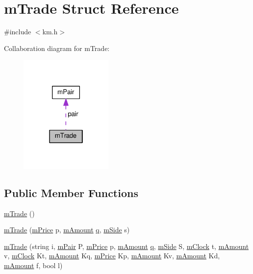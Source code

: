 \hypertarget{struct_k_1_1m_trade}{}\section{m\+Trade Struct Reference}
\label{struct_k_1_1m_trade}


{\ttfamily \#include $<$km.\+h$>$}



Collaboration diagram for m\+Trade\+:
\nopagebreak
\begin{figure}[H]
\begin{center}
\leavevmode
\includegraphics[width=130pt]{struct_k_1_1m_trade__coll__graph}
\end{center}
\end{figure}
\subsection*{Public Member Functions}
\begin{DoxyCompactItemize}
\item 
\hyperlink{struct_k_1_1m_trade_a645b1cd153838348bc43a21a1d5f70a4}{m\+Trade} ()
\item 
\hyperlink{struct_k_1_1m_trade_a34abd866cec68d1c3cc750375ecfd16a}{m\+Trade} (\hyperlink{km_8h_a392f9b7f384aa3539bbb890b059f5b8c}{m\+Price} p, \hyperlink{km_8h_ad4d00888c55a47a8a40ed8020d176086}{m\+Amount} \hyperlink{namespace_k_a211862d8b09ec46a051464b6859c1306a7694f4a66316e53c8cdd9d9954bd611d}{q}, \hyperlink{namespace_k_a0b7d0fa0ffc9f87da1d6499cbcee7e94}{m\+Side} s)
\item 
\hyperlink{struct_k_1_1m_trade_a48f7afc43dda9438c00f23f8578d3f69}{m\+Trade} (string i, \hyperlink{struct_k_1_1m_pair}{m\+Pair} P, \hyperlink{km_8h_a392f9b7f384aa3539bbb890b059f5b8c}{m\+Price} p, \hyperlink{km_8h_ad4d00888c55a47a8a40ed8020d176086}{m\+Amount} \hyperlink{namespace_k_a211862d8b09ec46a051464b6859c1306a7694f4a66316e53c8cdd9d9954bd611d}{q}, \hyperlink{namespace_k_a0b7d0fa0ffc9f87da1d6499cbcee7e94}{m\+Side} S, \hyperlink{km_8h_ad02a70cba4c52ba2013e5e32ceaeac1c}{m\+Clock} t, \hyperlink{km_8h_ad4d00888c55a47a8a40ed8020d176086}{m\+Amount} v, \hyperlink{km_8h_ad02a70cba4c52ba2013e5e32ceaeac1c}{m\+Clock} Kt, \hyperlink{km_8h_ad4d00888c55a47a8a40ed8020d176086}{m\+Amount} Kq, \hyperlink{km_8h_a392f9b7f384aa3539bbb890b059f5b8c}{m\+Price} Kp, \hyperlink{km_8h_ad4d00888c55a47a8a40ed8020d176086}{m\+Amount} Kv, \hyperlink{km_8h_ad4d00888c55a47a8a40ed8020d176086}{m\+Amount} Kd, \hyperlink{km_8h_ad4d00888c55a47a8a40ed8020d176086}{m\+Amount} f, bool l)
\end{DoxyCompactItemize}
